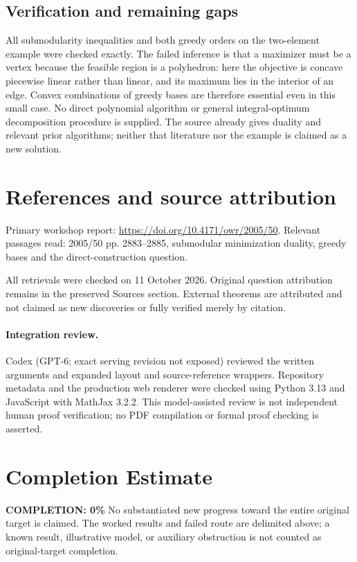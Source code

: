 \documentclass[11pt]{article}
\begin{document}
\subsection{Verification and remaining gaps}
All submodularity inequalities and both greedy orders on the two-element example were checked exactly. The failed inference is that a maximizer must be a vertex because the feasible region is a polyhedron: here the objective is concave piecewise linear rather than linear, and its maximum lies in the interior of an edge. Convex combinations of greedy bases are therefore essential even in this small case. No direct polynomial algorithm or general integral-optimum decomposition procedure is supplied. The source already gives duality and relevant prior algorithms; neither that literature nor the example is claimed as a new solution.

\section{References and source attribution}
Primary workshop report: \url{https://doi.org/10.4171/owr/2005/50}. Relevant passages read: 2005/50 pp. 2883--2885, submodular minimization duality, greedy bases and the direct-construction question.

All retrievals were checked on 11 October 2026. Original question attribution remains in the preserved Sources section. External theorems are attributed and not claimed as new discoveries or fully verified merely by citation.


\paragraph{Integration review.} Codex (GPT-6; exact serving revision not exposed) reviewed the written arguments and expanded layout and source-reference wrappers. Repository metadata and the production web renderer were checked using Python 3.13 and JavaScript with MathJax 3.2.2. This model-assisted review is not independent human proof verification; no PDF compilation or formal proof checking is asserted.

\section{Completion Estimate}
\noindent\textbf{COMPLETION: 0\%}
No substantiated new progress toward the entire original target is claimed. The worked results and failed route are delimited above; a known result, illustrative model, or auxiliary obstruction is not counted as original-target completion.
\end{document}
